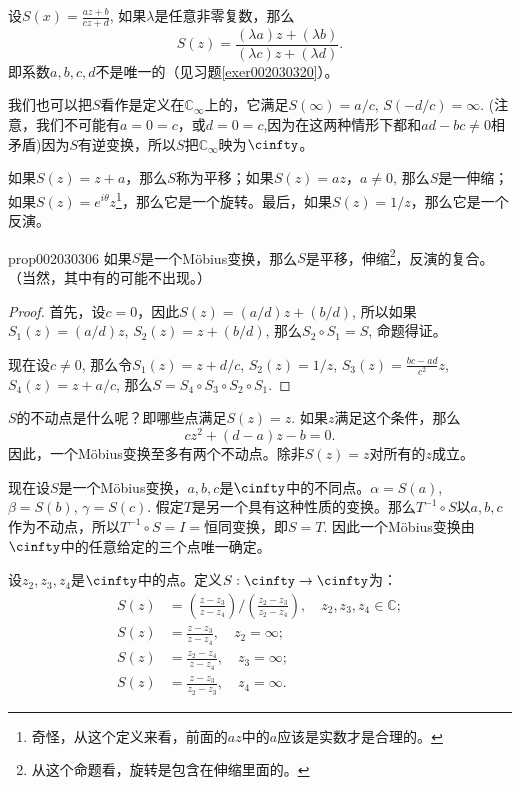 设$S(x) = \frac{az+b}{cz+d}$, 如果$\lambda$是任意非零复数，那么
\[
S(z) = \frac{(\lambda{}a)z + (\lambda{}b)}{(\lambda{}c)z + (\lambda{}d)}.
\]
即系数$a,b,c,d$不是唯一的（见习题\ref{exer002030320}）。

我们也可以把$S$看作是定义在$\mathbb{C}_{\infty}$上的，它满足$S(\infty) = a/c$, $S(-d/c) = \infty$. (注意，我们不可能有$a = 0 =c$，或$d = 0 = c$,因为在这两种情形下都和$ad - bc \neq 0$相矛盾)因为$S$有逆变换，所以$S$把$\mathbb{C}_{\infty}$映为$\cinfty$。

如果$S(z) = z+a$，那么$S$称为平移；如果$S(z)=az$，$a \neq 0$, 那么$S$是一伸缩；如果$S(z)=e^{i\theta}z$\footnote{奇怪，从这个定义来看，前面的$az$中的$a$应该是实数才是合理的。}，那么它是一个旋转。最后，如果$S(z) = 1/z$，那么它是一个反演。

\begin{proposition}{}{prop002030306}
如果$S$是一个M\"obius变换，那么$S$是平移，伸缩\footnote{从这个命题看，旋转是包含在伸缩里面的。}，反演的复合。（当然，其中有的可能不出现。）
\end{proposition}

\begin{proof}
首先，设$c = 0$，因此$S(z) = (a/d)z + (b/d)$, 所以如果$S_1(z)=(a/d)z$, $S_2(z) = z + (b/d)$, 那么$S_2 \circ S_1 = S$, 命题得证。

现在设$c \neq 0$, 那么令$S_1(z)=z + d/c$, $S_2(z) = 1/z$, $S_3(z) = \frac{bc - ad}{c^2}z$, $S_4(z) = z + a/c$, 那么$S = S_4 \circ S_3 \circ S_2 \circ S_1$.
\end{proof}

$S$的不动点是什么呢？即哪些点满足$S(z)=z$. 如果$z$满足这个条件，那么
\[
cz^2 + (d-a)z - b = 0.
\]
因此，一个M\"obius变换至多有两个不动点。除非$S(z)=z$对所有的$z$成立。


现在设$S$是一个M\"obius变换，$a,b,c$是$\cinfty$中的不同点。$\alpha=S(a)$, $\beta = S(b)$, $\gamma = S(c)$. 假定$T$是另一个具有这种性质的变换。那么$T^{-1}\circ S$以$a, b, c$作为不动点，所以$T^{-1}\circ S = I =$恒同变换，即$S=T$. 因此一个M\"obius变换由$\cinfty$中的任意给定的三个点唯一确定。

设$z_2, z_3, z_4$是$\cinfty$中的点。定义$S: \cinfty \to \cinfty$为：
\[
\begin{aligned}
S(z) &= (\frac{z - z_3}{z-z_4})/(\frac{z_2-z_3}{z_2-z_4}), \quad z_2,z_3, z_4 \in \mathbb{C};\\
S(z) &= \frac{z- z_3}{z-z_4},\quad z_2 = \infty;\\
S(z) &= \frac{z_2- z_4}{z-z_4},\quad z_3 = \infty;\\
S(z) &= \frac{z- z_3}{z_2-z_3},\quad z_4 = \infty.
\end{aligned}
\]

